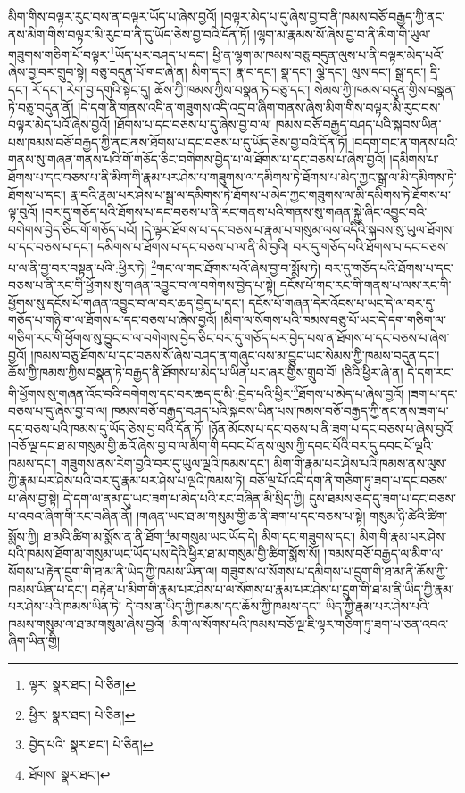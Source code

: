 མིག་གིས་བལྟར་རུང་བས་ན་བལྟར་ཡོད་པ་ཞེས་བྱའོ། །བལྟར་མེད་པ་དུ་ཞེས་བྱ་བ་ནི་ཁམས་བཅོ་བརྒྱད་ཀྱི་ནང་ནས་མིག་གིས་བལྟར་མི་རུང་བ་ནི་དུ་ཡོད་ཅེས་བྱ་བའི་དོན་ཏོ། །ལྷག་མ་རྣམས་སོ་ཞེས་བྱ་བ་ནི་མིག་གི་ཡུལ་གཟུགས་གཅིག་པོ་བལྟར་\footnote{ལྟར་  སྣར་ཐང་།  པེ་ཅིན། }ཡོད་པར་བཤད་པ་དང་། ཕྱི་ན་ལྷག་མ་ཁམས་བཅུ་བདུན་ལུས་པ་ནི་བལྟར་མེད་པའོ་ཞེས་བྱ་བར་གྲུབ་སྟེ། བཅུ་བདུན་པོ་གང་ཞེ་ན། མིག་དང་། རྣ་བ་དང་། སྣ་དང་། ལྕེ་དང་། ལུས་དང་། སྒྲ་དང་། དྲི་དང་། རོ་དང་། རེག་བྱ་དགུའི་སྟེང་དུ། ཆོས་ཀྱི་ཁམས་ཀྱིས་བསྣན་ཏེ་བཅུ་དང་། སེམས་ཀྱི་ཁམས་བདུན་གྱིས་བསྣན་ཏེ་བཅུ་བདུན་ནོ། །དེ་དག་ནི་གནས་འདི་ན་གཟུགས་འདི་འདྲ་བ་ཞིག་གནས་ཞེས་མིག་གིས་བལྟར་མི་རུང་བས་བལྟར་མེད་པའོ་ཞེས་བྱའོ། །ཐོགས་པ་དང་བཅས་པ་དུ་ཞེས་བྱ་བ་ལ། ཁམས་བཅོ་བརྒྱད་བཤད་པའི་སྐབས་ཡིན་པས་ཁམས་བཅོ་བརྒྱད་ཀྱི་ནང་ནས་ཐོགས་པ་དང་བཅས་པ་དུ་ཡོད་ཅེས་བྱ་བའི་དོན་ཏོ། །བདག་གང་ན་གནས་པའི་གནས་སུ་གཞན་གནས་པའི་གོ་གཅོད་ཅིང་བགེགས་བྱེད་པ་ལ་ཐོགས་པ་དང་བཅས་པ་ཞེས་བྱའོ། །དམིགས་པ་ཐོགས་པ་དང་བཅས་པ་ནི་མིག་གི་རྣམ་པར་ཤེས་པ་གཟུགས་ལ་དམིགས་ཏེ་ཐོགས་པ་མེད་ཀྱང་སྒྲ་ལ་མི་དམིགས་ཏེ་ཐོགས་པ་དང་། རྣ་བའི་རྣམ་པར་ཤེས་པ་སྒྲ་ལ་དམིགས་ཏེ་ཐོགས་པ་མེད་ཀྱང་གཟུགས་ལ་མི་དམིགས་ཏེ་ཐོགས་པ་ལྟ་བུའོ། །བར་དུ་གཅོད་པའི་ཐོགས་པ་དང་བཅས་པ་ནི་རང་གནས་པའི་གནས་སུ་གཞན་སྐྱེ་ཞིང་འབྱུང་བའི་བགེགས་བྱེད་ཅིང་གོ་གཅོད་པའོ། །དེ་ལྟར་ཐོགས་པ་དང་བཅས་པ་རྣམ་པ་གསུམ་ལས་འདིའི་སྐབས་སུ་ཡུལ་ཐོགས་པ་དང་བཅས་པ་དང་། དམིགས་པ་ཐོགས་པ་དང་བཅས་པ་ལ་ནི་མི་བྱའི། བར་དུ་གཅོད་པའི་ཐོགས་པ་དང་བཅས་པ་ལ་ནི་བྱ་བར་བསྟན་པའི་:ཕྱིར་ཏེ། \footnote{ཕྱིར་  སྣར་ཐང་།  པེ་ཅིན། }གང་ལ་གང་ཐོགས་པའོ་ཞེས་བྱ་བ་སྨོས་ཏེ། བར་དུ་གཅོད་པའི་ཐོགས་པ་དང་བཅས་པ་ནི་རང་གི་ཕྱོགས་སུ་གཞན་འབྱུང་བ་ལ་བགེགས་བྱེད་པ་སྟེ། དངོས་པོ་གང་རང་གི་གནས་པ་ལས་རང་གི་ཕྱོགས་སུ་དངོས་པོ་གཞན་འབྱུང་བ་ལ་བར་ཆད་བྱེད་པ་དང་། དངོས་པོ་གཞན་དེར་འོངས་པ་ཡང་དེ་ལ་བར་དུ་གཅོད་པ་གཉི་ག་ལ་ཐོགས་པ་དང་བཅས་པ་ཞེས་བྱའོ། །མིག་ལ་སོགས་པའི་ཁམས་བཅུ་པོ་ཡང་དེ་དག་གཅིག་ལ་གཅིག་རང་གི་ཕྱོགས་སུ་བྱུང་བ་ལ་བགེགས་བྱེད་ཅིང་བར་དུ་གཅོད་པར་བྱེད་པས་ན་ཐོགས་པ་དང་བཅས་པ་ཞེས་བྱའོ། །ཁམས་བཅུ་ཐོགས་པ་དང་བཅས་སོ་ཞེས་བཤད་ན་གཞུང་ལས་མ་བྱུང་ཡང་སེམས་ཀྱི་ཁམས་བདུན་དང་། ཆོས་ཀྱི་ཁམས་ཀྱིས་བསྣན་ཏེ་བརྒྱད་ནི་ཐོགས་པ་མེད་པ་ཡིན་པར་ཞར་གྱིས་གྲུབ་བོ། །ཅིའི་ཕྱིར་ཞེ་ན། དེ་དག་རང་གི་ཕྱོགས་སུ་གཞན་འོང་བའི་བགེགས་དང་བར་ཆད་དུ་མི་:བྱེད་པའི་ཕྱིར་\footnote{བྱེད་པའི་  སྣར་ཐང་།  པེ་ཅིན། }ཐོགས་པ་མེད་པ་ཞེས་བྱའོ། །ཟག་པ་དང་བཅས་པ་དུ་ཞེས་བྱ་བ་ལ། ཁམས་བཅོ་བརྒྱད་བཤད་པའི་སྐབས་ཡིན་པས་ཁམས་བཅོ་བརྒྱད་ཀྱི་ནང་ནས་ཟག་པ་དང་བཅས་པའི་ཁམས་དུ་ཡོད་ཅེས་བྱ་བའི་དོན་ཏོ། །ཉོན་མོངས་པ་དང་བཅས་པ་ནི་ཟག་པ་དང་བཅས་པ་ཞེས་བྱའོ། །བཅོ་ལྔ་དང་ཐ་མ་གསུམ་གྱི་ཆའོ་ཞེས་བྱ་བ་ལ་མིག་གི་དབང་པོ་ནས་ལུས་ཀྱི་དབང་པོའི་བར་དུ་དབང་པོ་ལྔའི་ཁམས་དང་། གཟུགས་ནས་རེག་བྱའི་བར་དུ་ཡུལ་ལྔའི་ཁམས་དང་། མིག་གི་རྣམ་པར་ཤེས་པའི་ཁམས་ནས་ལུས་ཀྱི་རྣམ་པར་ཤེས་པའི་བར་དུ་རྣམ་པར་ཤེས་པ་ལྔའི་ཁམས་ཏེ། བཅོ་ལྔ་པོ་འདི་དག་ནི་གཅིག་ཏུ་ཟག་པ་དང་བཅས་པ་ཞེས་བྱ་སྟེ། དེ་དག་ལ་ནམ་དུ་ཡང་ཟག་པ་མེད་པའི་རང་བཞིན་མི་སྲིད་ཀྱི། དུས་ཐམས་ཅད་དུ་ཟག་པ་དང་བཅས་པ་འབའ་ཞིག་གི་རང་བཞིན་ནོ། །གཞན་ཡང་ཐ་མ་གསུམ་གྱི་ཆ་ནི་ཟག་པ་དང་བཅས་པ་སྟེ། གསུམ་ཉི་ཚེའི་ཚིག་སྨོས་ཀྱི། ཐ་མའི་ཚིག་མ་སྨོས་ན་ནི་ཐོག་\footnote{ཐོགས་  སྣར་ཐང་། }མ་གསུམ་ཡང་ཡོད་དེ། མིག་དང་གཟུགས་དང་། མིག་གི་རྣམ་པར་ཤེས་པའི་ཁམས་ཐོག་མ་གསུམ་ཡང་ཡོད་པས་དེའི་ཕྱིར་ཐ་མ་གསུམ་གྱི་ཚིག་སྨོས་སོ། །ཁམས་བཅོ་བརྒྱད་ལ་མིག་ལ་སོགས་པ་རྟེན་དྲུག་གི་ཐ་མ་ནི་ཡིད་ཀྱི་ཁམས་ཡིན་ལ། གཟུགས་ལ་སོགས་པ་དམིགས་པ་དྲུག་གི་ཐ་མ་ནི་ཆོས་ཀྱི་ཁམས་ཡིན་པ་དང་། བརྟེན་པ་མིག་གི་རྣམ་པར་ཤེས་པ་ལ་སོགས་པ་རྣམ་པར་ཤེས་པ་དྲུག་གི་ཐ་མ་ནི་ཡིད་ཀྱི་རྣམ་པར་ཤེས་པའི་ཁམས་ཡིན་ཏེ། དེ་བས་ན་ཡིད་ཀྱི་ཁམས་དང་ཆོས་ཀྱི་ཁམས་དང་། ཡིད་ཀྱི་རྣམ་པར་ཤེས་པའི་ཁམས་གསུམ་ལ་ཐ་མ་གསུམ་ཞེས་བྱའོ། །མིག་ལ་སོགས་པའི་ཁམས་བཅོ་ལྔ་ཇི་ལྟར་གཅིག་ཏུ་ཟག་པ་ཅན་འབའ་ཞིག་ཡིན་གྱི། 